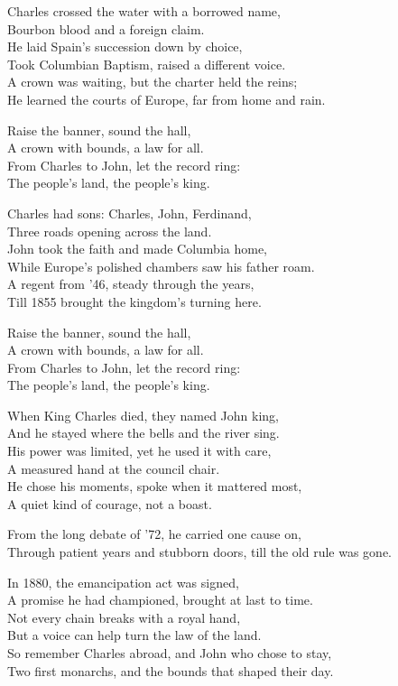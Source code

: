\begin{lyrics}
Charles crossed the water with a borrowed name,\\
Bourbon blood and a foreign claim.\\
He laid Spain’s succession down by choice,\\
Took Columbian Baptism, raised a different voice.\\
A crown was waiting, but the charter held the reins;\\
He learned the courts of Europe, far from home and rain.

Raise the banner, sound the hall,\\
A crown with bounds, a law for all.\\
From Charles to John, let the record ring:\\
The people’s land, the people’s king.

Charles had sons: Charles, John, Ferdinand,\\
Three roads opening across the land.\\
John took the faith and made Columbia home,\\
While Europe’s polished chambers saw his father roam.\\
A regent from ’46, steady through the years,\\
Till 1855 brought the kingdom’s turning here.

Raise the banner, sound the hall,\\
A crown with bounds, a law for all.\\
From Charles to John, let the record ring:\\
The people’s land, the people’s king.

When King Charles died, they named John king,\\
And he stayed where the bells and the river sing.\\
His power was limited, yet he used it with care,\\
A measured hand at the council chair.\\
He chose his moments, spoke when it mattered most,\\
A quiet kind of courage, not a boast.

From the long debate of ’72, he carried one cause on,\\
Through patient years and stubborn doors, till the old rule was gone.

In 1880, the emancipation act was signed,\\
A promise he had championed, brought at last to time.\\
Not every chain breaks with a royal hand,\\
But a voice can help turn the law of the land.\\
So remember Charles abroad, and John who chose to stay,\\
Two first monarchs, and the bounds that shaped their day.


\end{lyrics}
